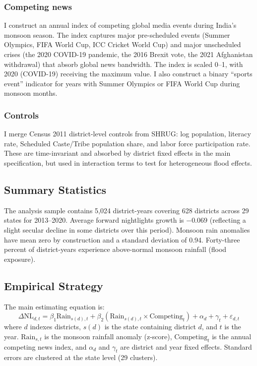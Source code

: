 \documentclass[12pt]{article}
\begin{document}
\subsubsection*{Competing news} I construct an annual index of competing global media events during India's monsoon season. The index captures major pre-scheduled events (Summer Olympics, FIFA World Cup, ICC Cricket World Cup) and major unscheduled crises (the 2020 COVID-19 pandemic, the 2016 Brexit vote, the 2021 Afghanistan withdrawal) that absorb global news bandwidth. The index is scaled 0--1, with 2020 (COVID-19) receiving the maximum value. I also construct a binary ``sports event'' indicator for years with Summer Olympics or FIFA World Cup during monsoon months.

\subsubsection*{Controls} I merge Census 2011 district-level controls from SHRUG: log population, literacy rate, Scheduled Caste/Tribe population share, and labor force participation rate. These are time-invariant and absorbed by district fixed effects in the main specification, but used in interaction terms to test for heterogeneous flood effects.

\subsection{Summary Statistics}



The analysis sample contains 5,024 district-years covering 628 districts across 29 states for 2013--2020. Average forward nightlights growth is $-0.069$ (reflecting a slight secular decline in some districts over this period). Monsoon rain anomalies have mean zero by construction and a standard deviation of 0.94. Forty-three percent of district-years experience above-normal monsoon rainfall (flood exposure).

\subsection{Empirical Strategy}

The main estimating equation is:
\begin{equation}
\Delta \text{NL}_{d,t} = \beta_1 \text{Rain}_{s(d),t} + \beta_2 (\text{Rain}_{s(d),t} \times \text{Competing}_t) + \alpha_d + \gamma_t + \varepsilon_{d,t}
\label{eq:main}
\end{equation}
where $d$ indexes districts, $s(d)$ is the state containing district $d$, and $t$ is the year. $\text{Rain}_{s,t}$ is the monsoon rainfall anomaly (z-score), $\text{Competing}_t$ is the annual competing news index, and $\alpha_d$ and $\gamma_t$ are district and year fixed effects. Standard errors are clustered at the state level (29 clusters).
\end{document}
